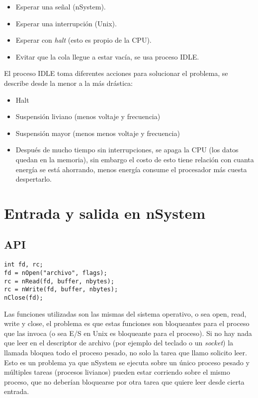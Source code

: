 \begin{itemize}
	\item Esperar una señal (nSystem).
	\item Esperar una interrupción (Unix).
	\item Esperar con \textit{halt} (esto es propio de la CPU).
	\item Evitar que la cola llegue a estar vacía, se usa proceso IDLE.
\end{itemize}

El proceso IDLE toma diferentes acciones para solucionar el problema, se describe desde la menor a la más drástica:
\begin{itemize}
	\item Halt
	\item Suspensión liviano (menos voltaje y frecuencia)
	\item Suspensión mayor (menos menos voltaje y frecuencia)
	\item Después de mucho tiempo sin interrupciones, se apaga la CPU (los datos quedan en la memoria), sin embargo el costo de esto tiene relación con cuanta energía se está ahorrando, menos energía consume el procesador más cuesta despertarlo.
\end{itemize}

\section{Entrada y salida en nSystem}

\subsection{API}

\begin{verbatim}
int fd, rc;
fd = nOpen("archivo", flags);
rc = nRead(fd, buffer, nbytes);
rc = nWrite(fd, buffer, nbytes);
nClose(fd);
\end{verbatim}

Las funciones utilizadas son las mismas del sistema operativo, o sea open, read, write y close, el problema es que estas funciones son bloqueantes para el proceso que las invoca (o sea E/S en Unix es bloqueante para el proceso). Si no hay nada que leer en el descriptor de archivo (por ejemplo del teclado o un \textit{socket}) la llamada bloquea todo el proceso pesado, no solo la tarea que llamo solicito leer. Esto es un problema ya que nSystem se ejecuta sobre un único proceso pesado y múltiples tareas (procesos livianos) pueden estar corriendo sobre el mismo proceso, que no deberían bloquearse por otra tarea que quiere leer desde cierta entrada.

